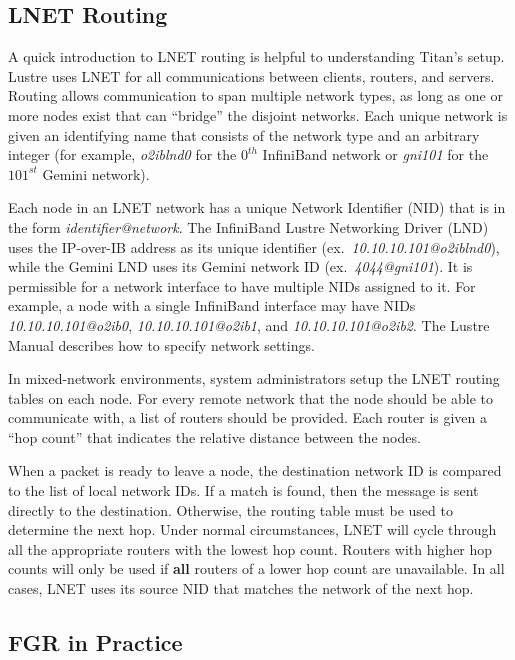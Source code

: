 \subsection{LNET Routing}

A quick introduction to LNET routing is helpful to understanding Titan's setup.
Lustre uses LNET for all communications between clients, routers, and servers.
Routing allows communication to span multiple network types, as long as one or
more nodes exist that can ``bridge'' the disjoint networks.  Each unique
network is given an identifying name that consists of the network type and an
arbitrary integer (for example, \textit{o2iblnd0} for the $0^{th}$ InfiniBand
network or \textit{gni101} for the $101^{st}$ Gemini network).

Each node in an LNET network has a unique Network Identifier (NID) that is in
the form \textit{identifier@network}.  The InfiniBand Lustre Networking Driver
(LND) uses the IP-over-IB address as its unique identifier
(ex.~\textit{10.10.10.101@o2iblnd0}), while the Gemini LND uses its Gemini
network ID (ex.~\textit{4044@gni101}).  It is permissible for a network
interface to have multiple NIDs assigned to it.  For example, a node with a
single InfiniBand interface may have NIDs \textit{10.10.10.101@o2ib0},
\textit{10.10.10.101@o2ib1}, and \textit{10.10.10.101@o2ib2}.  The Lustre
Manual \cite{lustre-manual} describes how to specify network settings.

In mixed-network environments, system administrators setup the LNET routing
tables on each node.  For every remote network that the node should be able to
communicate with, a list of routers should be provided.  Each router is given a
``hop count'' that indicates the relative distance between the nodes.

When a packet is ready to leave a node, the destination network ID is compared
to the list of local network IDs.  If a match is found, then the message is
sent directly to the destination.  Otherwise, the routing table must be used to
determine the next hop.  Under normal circumstances, LNET will cycle through
all the appropriate routers with the lowest hop count.  Routers with higher hop
counts will only be used if \textbf{all} routers of a lower hop count are
unavailable.  In all cases, LNET uses its source NID that matches the network
of the next hop.

\subsection{FGR in Practice}

